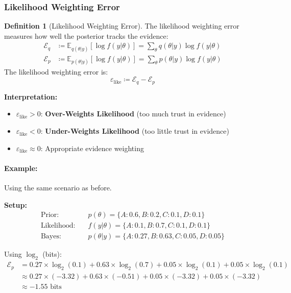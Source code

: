 \documentclass{article}
\theoremstyle{definition}
\newtheorem{definition}{Definition}
\begin{document}
\subsubsection{Likelihood Weighting Error}

\begin{definition}[Likelihood Weighting Error]
The likelihood weighting error measures how well the posterior tracks the evidence:
\begin{align}
\mathcal{E}_q &\coloneqq \mathbb{E}_{q(\theta|y)}[\log f(y|\theta)] = \sum_{\theta} q(\theta|y) \log f(y|\theta) \\
\mathcal{E}_p &\coloneqq \mathbb{E}_{p(\theta|y)}[\log f(y|\theta)] = \sum_{\theta} p(\theta|y) \log f(y|\theta)
\end{align}
The likelihood weighting error is:
\begin{equation}
\varepsilon_{\text{like}} \coloneqq \mathcal{E}_q - \mathcal{E}_p
\end{equation}
\end{definition}

\textbf{Interpretation:}
\begin{itemize}
    \item $\varepsilon_{\text{like}} > 0$: \textbf{Over-Weights Likelihood} (too much trust in evidence)
    \item $\varepsilon_{\text{like}} < 0$: \textbf{Under-Weights Likelihood} (too little trust in evidence)
    \item $\varepsilon_{\text{like}} \approx 0$: Appropriate evidence weighting
\end{itemize}

\paragraph{Example:} Using the same scenario as before.

\textbf{Setup:}
\begin{align*}
\text{Prior:} \quad &p(\theta) = \{A: 0.6, B: 0.2, C: 0.1, D: 0.1\} \\
\text{Likelihood:} \quad &f(y|\theta) = \{A: 0.1, B: 0.7, C: 0.1, D: 0.1\} \\
\text{Bayes:} \quad &p(\theta|y) = \{A: 0.27, B: 0.63, C: 0.05, D: 0.05\}
\end{align*}

Using $\log_2$ (bits):
\begin{align*}
\mathcal{E}_p &= 0.27 \times \log_2(0.1) + 0.63 \times \log_2(0.7) + 0.05 \times \log_2(0.1) + 0.05 \times \log_2(0.1) \\
&\approx 0.27 \times (-3.32) + 0.63 \times (-0.51) + 0.05 \times (-3.32) + 0.05 \times (-3.32) \\
&\approx -1.55 \text{ bits}
\end{align*}
\end{document}
